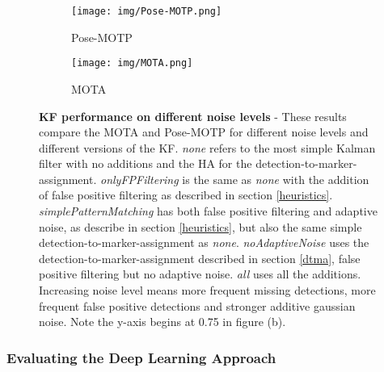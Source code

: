 \documentclass[12pt,a4paper]{article}
\begin{document}
\begin{figure}[!htbp]
	\begin{center}
		\begin{subfigure}[b]{0.495\textwidth}
			\label{NN_mlp_encoder}
			\texttt{[image: img/Pose-MOTP.png]}
			\caption{Pose-MOTP}
		\end{subfigure}
		\begin{subfigure}[b]{0.495\textwidth}
			\label{NN_lstm_encoder}
			\texttt{[image: img/MOTA.png]}
			\caption{MOTA}
		\end{subfigure}

	\end{center}
	\caption{\textbf{KF performance on different noise levels} - These results compare the MOTA and Pose-MOTP for different noise levels and different versions of the KF. \emph{none} refers to the most simple Kalman filter with no additions and the HA for the detection-to-marker-assignment. \emph{onlyFPFiltering} is the same as \emph{none} with the addition of false positive filtering as described in section \ref{heuristics}. \emph{simplePatternMatching} has both false positive filtering and adaptive noise, as describe in section \ref{heuristics}, but also the same simple detection-to-marker-assignment as \emph{none}. \emph{noAdaptiveNoise} uses the detection-to-marker-assignment described in section \ref{dtma}, false positive filtering but no adaptive noise. \emph{all} uses all the additions. Increasing noise level means more frequent missing detections, more frequent false positive detections and stronger additive gaussian noise. Note the y-axis begins at 0.75 in figure (b).}
	\label{KF_mot_metrics}
\end{figure}

\subsubsection{Evaluating the Deep Learning Approach}
\label{results_dl}
\end{document}
